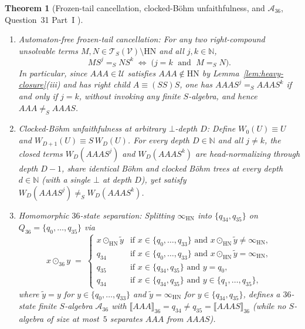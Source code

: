 \documentclass[11pt,reqno]{amsart}
\numberwithin{equation}{section}
\theoremstyle{plain}
\newtheorem{theorem}{Theorem}[section]
\theoremstyle{definition}
\theoremstyle{remark}
\newcommand{\TSV}{\mathcal{T}_S(\mathcal{V})}
\newcommand{\HN}{\mathrm{HN}}
\newcommand{\sem}[1]{\llbracket #1 \rrbracket}
\newcommand{\convS}{=_S}
\begin{document}
\begin{theorem}[Frozen-tail cancellation, clocked-B\"ohm unfaithfulness, and $\mathcal{A}_{36}$, Question~31 Part~I {\cite[p.~93]{BarendregtEndrullisKlopWaldmann2017}}]\label{thm:question-31}
\begin{enumerate}[label=(\roman*),leftmargin=2.2em]
  \item \emph{Automaton-free frozen-tail cancellation:} For any two right-compound unsolvable terms $M, N \in \TSV \setminus \HN$ and all $j, k \in \mathbb{N}$,
  \[
  M S^j \convS N S^k \;\Longleftrightarrow\; \bigl(j = k \;\textrm{ and }\; M \convS N\bigr).
  \]
  In particular, since $A A A \in \mathcal{U}$ satisfies $A A A \notin \HN$ by Lemma~\ref{lem:heavy-closure}(iii) and has right child $A \equiv (S S) S$, one has $A A A S^j \convS A A A S^k$ if and only if $j = k$, without invoking any finite $S$-algebra, and hence $A A A \neq_S A A A S$.
  \item \emph{Clocked-B\"ohm unfaithfulness at arbitrary $\bot$-depth $D$:} Define $W_0(U) \equiv U$ and $W_{D+1}(U) \equiv S\,W_D(U)$. For every depth $D \in \mathbb{N}$ and all $j \neq k$, the closed terms $W_D(A A A S^j)$ and $W_D(A A A S^k)$ are head-normalizing through depth $D - 1$, share identical B\"ohm and clocked B\"ohm trees at every depth $d \in \mathbb{N}$ (with a single $\bot$ at depth $D$), yet satisfy $W_D(A A A S^j) \neq_S W_D(A A A S^k)$.
  \item \emph{Homomorphic $36$-state separation:} Splitting $\infty_{\HN}$ into $\{q_{34}, q_{35}\}$ on $Q_{36} = \{q_0, \dots, q_{35}\}$ via
  \begin{equation}\label{eq:a36-def}
  x \odot_{36} y \;=\;
  \begin{cases}
  x \odot_{\HN} \tilde{y} & \textrm{if } x \in \{q_0, \dots, q_{33}\} \textrm{ and } x \odot_{\HN} \tilde{y} \neq \infty_{\HN}, \\
  q_{34} & \textrm{if } x \in \{q_0, \dots, q_{33}\} \textrm{ and } x \odot_{\HN} \tilde{y} = \infty_{\HN}, \\
  q_{35} & \textrm{if } x \in \{q_{34}, q_{35}\} \textrm{ and } y = q_0, \\
  q_{34} & \textrm{if } x \in \{q_{34}, q_{35}\} \textrm{ and } y \in \{q_1, \dots, q_{35}\},
  \end{cases}
  \end{equation}
  where $\tilde{y} = y$ for $y \in \{q_0, \dots, q_{33}\}$ and $\tilde{y} = \infty_{\HN}$ for $y \in \{q_{34}, q_{35}\}$, defines a $36$-state finite $S$-algebra $\mathcal{A}_{36}$ with $\sem{A A A}_{36} = q_{34} \neq q_{35} = \sem{A A A S}_{36}$ (while no $S$-algebra of size at most~$5$ separates $A A A$ from $A A A S$).
\end{enumerate}
\end{theorem}
\end{document}

